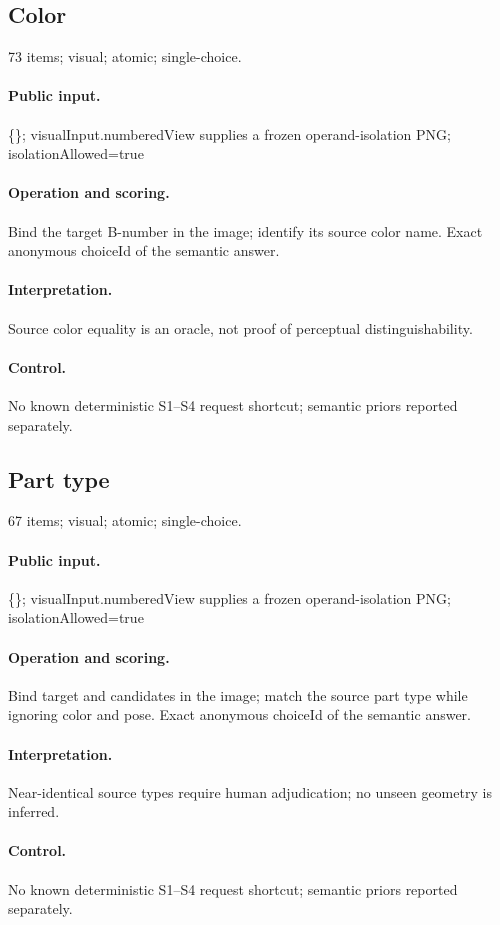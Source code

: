 \subsection{Color}
73 items; visual; atomic; single-choice.
\paragraph{Public input.}\{\}; visualInput.numberedView supplies a frozen operand-isolation PNG; isolationAllowed=true
\paragraph{Operation and scoring.}Bind the target B-number in the image; identify its source color name. Exact anonymous choiceId of the semantic answer.
\paragraph{Interpretation.}Source color equality is an oracle, not proof of perceptual distinguishability.
\paragraph{Control.}No known deterministic S1--S4 request shortcut; semantic priors reported separately.
\subsection{Part type}
67 items; visual; atomic; single-choice.
\paragraph{Public input.}\{\}; visualInput.numberedView supplies a frozen operand-isolation PNG; isolationAllowed=true
\paragraph{Operation and scoring.}Bind target and candidates in the image; match the source part type while ignoring color and pose. Exact anonymous choiceId of the semantic answer.
\paragraph{Interpretation.}Near-identical source types require human adjudication; no unseen geometry is inferred.
\paragraph{Control.}No known deterministic S1--S4 request shortcut; semantic priors reported separately.
